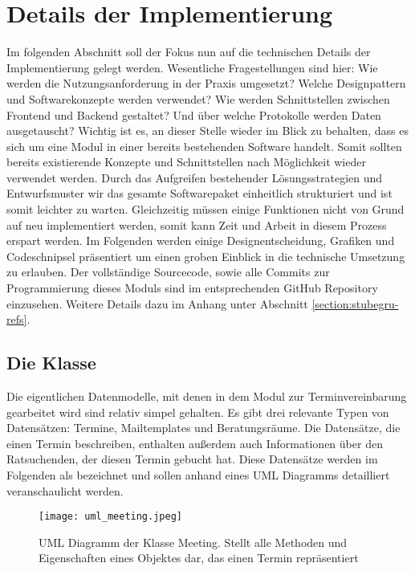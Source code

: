 \section{Details der Implementierung}
Im folgenden Abschnitt soll der Fokus nun auf die technischen Details der
Implementierung gelegt werden. Wesentliche Fragestellungen sind hier: Wie
werden die Nutzungsanforderung in der Praxis umgesetzt? Welche Designpattern
und Softwarekonzepte werden verwendet? Wie werden Schnittstellen zwischen
Frontend und Backend gestaltet? Und über welche Protokolle werden Daten
ausgetauscht? Wichtig ist es, an dieser Stelle wieder im Blick zu behalten,
dass es sich um eine Modul in einer bereits bestehenden Software handelt. Somit
sollten bereits existierende Konzepte und Schnittstellen nach Möglichkeit
wieder verwendet werden. Durch das Aufgreifen bestehender Lösungsstrategien und
Entwurfsmuster wir das gesamte Softwarepaket einheitlich strukturiert und ist
somit leichter zu warten. Gleichzeitig müssen einige Funktionen nicht von Grund
auf neu implementiert werden, somit kann Zeit und Arbeit in diesem Prozess
erspart werden\cite{wiederverwSoftware}. Im Folgenden werden einige
Designentscheidung, Grafiken und Codeschnipsel präsentiert um einen groben
Einblick in die technische Umsetzung zu erlauben. Der vollständige Sourcecode,
sowie alle Commits zur Programmierung dieses Moduls sind im entsprechenden
GitHub Repository einzusehen. Weitere Details dazu im Anhang unter Abschnitt
\ref{section:stubegru-refs}.

\subsection{Die Klasse }
Die eigentlichen Datenmodelle, mit denen in dem Modul zur Terminvereinbarung
gearbeitet wird sind relativ simpel gehalten. Es gibt drei relevante Typen von
Datensätzen: Termine, Mailtemplates und Beratungsräume. Die Datensätze, die
einen Termin beschreiben, enthalten außerdem auch Informationen über den
Ratsuchenden, der diesen Termin gebucht hat. Diese Datensätze werden im
Folgenden als  bezeichnet und sollen anhand eines \gls{UML}
Diagramms detailliert veranschaulicht werden.

\begin{figure}[H]
    \caption{UML Diagramm der Klasse Meeting. Stellt alle Methoden und Eigenschaften eines Objektes dar, das einen Termin repräsentiert}
    \centering
    \texttt{[image: uml\_meeting.jpeg]}
\end{figure}

